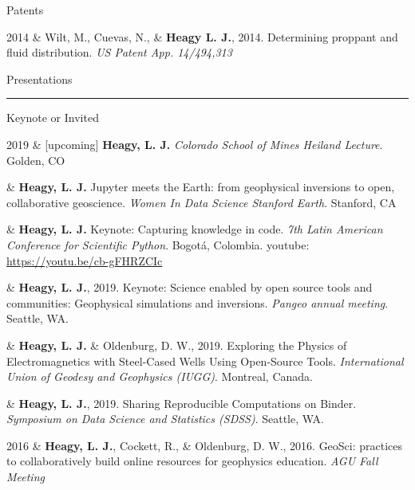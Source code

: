 \documentclass[a4paper, 11pt]{article}
\newcommand{\youtube}[1]{youtube: \href{https://youtu.be/XY3Tq9Wd1\_A}{#1}}
\newcommand{\heading}[1]{
    \begin{minipage}[t]{\textwidth}
    \vspace{0.1cm}
    {\LARGE #1}\\
    \vspace{-0.24cm}
    \hrule
    \end{minipage}
    \vspace{0.05cm}

}
\newcommand{\subheading}[1]{
    \vspace{0.4cm}
    {\Large #1}\\
    \vspace{-0.2cm}
}
\begin{document}
\subheading{Patents}

\begin{entryright}
2014 & Wilt, M., Cuevas, N., \& \textbf{Heagy L. J.}, 2014. Determining proppant and fluid distribution. \emph{US Patent App. 14/494,313}
\end{entryright}



\heading{Presentations}

\subheading{Keynote or Invited}


\begin{entryright}
2019 & [upcoming] \textbf{Heagy, L. J.} \emph{Colorado School of Mines Heiland Lecture}. Golden, CO
\end{entryright}

\begin{entryright}
& \textbf{Heagy, L. J.} Jupyter meets the Earth: from geophysical inversions to open, collaborative geoscience. \emph{Women In Data Science \@ Stanford Earth}. Stanford, CA
\end{entryright}

\begin{entryright}
& \textbf{Heagy, L. J.} Keynote: Capturing knowledge in code. \emph{7th Latin American Conference for Scientific Python}. Bogot\'a, Colombia. \youtube{https://youtu.be/cb-gFHRZCIc}
\end{entryright}

\begin{entryright}
& \textbf{Heagy, L. J.}, 2019. Keynote: Science enabled by open source tools and communities: Geophysical simulations and inversions. \emph{Pangeo annual meeting}. Seattle, WA.
\end{entryright}

\begin{entryright}
& \textbf{Heagy, L. J.} \& Oldenburg, D. W., 2019. Exploring the Physics of Electromagnetics with Steel-Cased Wells Using Open-Source Tools. \emph{International Union of Geodesy and Geophysics (IUGG)}. Montreal, Canada.
\end{entryright}

\begin{entryright}
&  \textbf{Heagy, L. J.}, 2019. Sharing Reproducible Computations on Binder. \emph{Symposium on Data Science and Statistics (SDSS)}. Seattle, WA.
\end{entryright}


\begin{entryright}
2016 & \textbf{Heagy, L. J.}, Cockett, R., \& Oldenburg, D. W., 2016. GeoSci: practices to collaboratively build online resources for geophysics education. \emph{AGU Fall Meeting}
\end{entryright}
\end{document}
